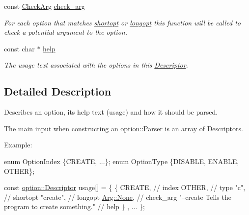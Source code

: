 \begin{DoxyCompactItemize}
const \hyperlink{namespaceoption_a4cdf403efae65e18bf850e2001b12a2a}{Check\+Arg} \hyperlink{structoption_1_1_descriptor_aa5d675dba0214a4abd73007ff163cc67}{check\+\_\+arg}
\begin{DoxyCompactList}\small\item\em For each option that matches \hyperlink{structoption_1_1_descriptor_a0dba4ccca59c19d6ed4081391fca5adb}{shortopt} or \hyperlink{structoption_1_1_descriptor_a470c449dfa894c9bfda2dae026142b4b}{longopt} this function will be called to check a potential argument to the option. \end{DoxyCompactList}\item 
const char $\ast$ \hyperlink{structoption_1_1_descriptor_a9045b19311533e1b8a08645d57149c79}{help}
\begin{DoxyCompactList}\small\item\em The usage text associated with the options in this \hyperlink{structoption_1_1_descriptor}{Descriptor}. \end{DoxyCompactList}\end{DoxyCompactItemize}


\subsection{Detailed Description}
Describes an option, its help text (usage) and how it should be parsed. 

The main input when constructing an \hyperlink{classoption_1_1_parser}{option\+::\+Parser} is an array of Descriptors.

\begin{DoxyParagraph}{Example\+:}

\begin{DoxyCode}
\textcolor{keyword}{enum} OptionIndex \{CREATE, ...\};
\textcolor{keyword}{enum} OptionType \{DISABLE, ENABLE, OTHER\};

\textcolor{keyword}{const} \hyperlink{structoption_1_1_descriptor}{option::Descriptor} usage[] = \{
  \{ CREATE,                                            \textcolor{comment}{// index}
    OTHER,                                             \textcolor{comment}{// type}
    \textcolor{stringliteral}{"c"},                                               \textcolor{comment}{// shortopt}
    \textcolor{stringliteral}{"create"},                                          \textcolor{comment}{// longopt}
    \hyperlink{structoption_1_1_arg_a7fc01987899c91c6b6a1be5711a46e22}{Arg::None},                                         \textcolor{comment}{// check\_arg}
    \textcolor{stringliteral}{"--create  Tells the program to create something."} \textcolor{comment}{// help}
  \}
  , ...
\};
\end{DoxyCode}
 
\end{DoxyParagraph}


